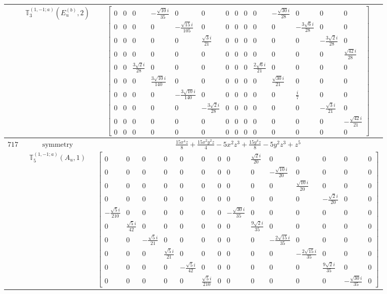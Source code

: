\documentclass[fleqn,8pt,landscape]{jsarticle}
\begin{document}
\begin{longtable}{ccc}
$  $ & $ \mathbb{T}_{3}^{(1,-1;a)}(E_{u}^{(b)},2) $ & $ \begin{bmatrix} 0 & 0 & 0 & - \frac{\sqrt{10} i}{35} & 0 & 0 & 0 & 0 & 0 & 0 & - \frac{\sqrt{30} i}{28} & 0 & 0 & 0 \\ 0 & 0 & 0 & 0 & - \frac{\sqrt{15} i}{105} & 0 & 0 & 0 & 0 & 0 & 0 & - \frac{3 \sqrt{6} i}{28} & 0 & 0 \\ 0 & 0 & 0 & 0 & 0 & \frac{\sqrt{3} i}{21} & 0 & 0 & 0 & 0 & 0 & 0 & - \frac{3 \sqrt{2} i}{28} & 0 \\ 0 & 0 & 0 & 0 & 0 & 0 & 0 & 0 & 0 & 0 & 0 & 0 & 0 & \frac{\sqrt{42} i}{28} \\ 0 & 0 & \frac{3 \sqrt{2} i}{28} & 0 & 0 & 0 & 0 & 0 & 0 & \frac{2 \sqrt{6} i}{21} & 0 & 0 & 0 & 0 \\ 0 & 0 & 0 & \frac{3 \sqrt{10} i}{140} & 0 & 0 & 0 & 0 & 0 & 0 & \frac{\sqrt{30} i}{21} & 0 & 0 & 0 \\ 0 & 0 & 0 & 0 & - \frac{3 \sqrt{10} i}{140} & 0 & 0 & 0 & 0 & 0 & 0 & \frac{i}{7} & 0 & 0 \\ 0 & 0 & 0 & 0 & 0 & - \frac{3 \sqrt{2} i}{28} & 0 & 0 & 0 & 0 & 0 & 0 & - \frac{\sqrt{3} i}{21} & 0 \\ 0 & 0 & 0 & 0 & 0 & 0 & 0 & 0 & 0 & 0 & 0 & 0 & 0 & - \frac{\sqrt{42} i}{21} \\ 0 & 0 & 0 & 0 & 0 & 0 & 0 & 0 & 0 & 0 & 0 & 0 & 0 & 0 \end{bmatrix} $ \\ \hline
$ 717 $ & $ \text{symmetry} $ & $ \frac{15 x^{4} z}{8} + \frac{15 x^{2} y^{2} z}{4} - 5 x^{2} z^{3} + \frac{15 y^{4} z}{8} - 5 y^{2} z^{3} + z^{5} $ \\
$  $ & $ \mathbb{T}_{5}^{(1,-1;a)}(A_{u},1) $ & $ \begin{bmatrix} 0 & 0 & 0 & 0 & 0 & 0 & 0 & 0 & \frac{\sqrt{2} i}{20} & 0 & 0 & 0 & 0 & 0 \\ 0 & 0 & 0 & 0 & 0 & 0 & 0 & 0 & 0 & - \frac{\sqrt{10} i}{20} & 0 & 0 & 0 & 0 \\ 0 & 0 & 0 & 0 & 0 & 0 & 0 & 0 & 0 & 0 & \frac{\sqrt{10} i}{20} & 0 & 0 & 0 \\ 0 & 0 & 0 & 0 & 0 & 0 & 0 & 0 & 0 & 0 & 0 & - \frac{\sqrt{2} i}{20} & 0 & 0 \\ - \frac{\sqrt{5} i}{210} & 0 & 0 & 0 & 0 & 0 & 0 & - \frac{\sqrt{30} i}{35} & 0 & 0 & 0 & 0 & 0 & 0 \\ 0 & \frac{\sqrt{5} i}{42} & 0 & 0 & 0 & 0 & 0 & 0 & \frac{9 \sqrt{2} i}{35} & 0 & 0 & 0 & 0 & 0 \\ 0 & 0 & - \frac{\sqrt{5} i}{21} & 0 & 0 & 0 & 0 & 0 & 0 & - \frac{2 \sqrt{15} i}{35} & 0 & 0 & 0 & 0 \\ 0 & 0 & 0 & \frac{\sqrt{5} i}{21} & 0 & 0 & 0 & 0 & 0 & 0 & - \frac{2 \sqrt{15} i}{35} & 0 & 0 & 0 \\ 0 & 0 & 0 & 0 & - \frac{\sqrt{5} i}{42} & 0 & 0 & 0 & 0 & 0 & 0 & \frac{9 \sqrt{2} i}{35} & 0 & 0 \\ 0 & 0 & 0 & 0 & 0 & \frac{\sqrt{5} i}{210} & 0 & 0 & 0 & 0 & 0 & 0 & - \frac{\sqrt{30} i}{35} & 0 \end{bmatrix} $ \\ \hline

\end{longtable}
\end{document}
